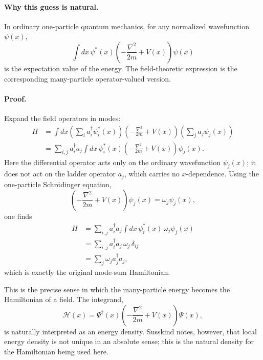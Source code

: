\paragraph{Why this guess is natural.}
In ordinary one-particle quantum mechanics, for any normalized wavefunction $\psi(x)$,
\begin{equation}
\int dx\,\psi^*(x)\left(-\frac{\nabla^2}{2m}+V(x)\right)\psi(x)
\end{equation}
is the expectation value of the energy. The field-theoretic expression is the corresponding many-particle operator-valued version.

\paragraph{Proof.}
Expand the field operators in modes:
\begin{align}
H
&=\int dx
\left(\sum_i a_i^\dagger \psi_i^*(x)\right)
\left(-\frac{\nabla^2}{2m}+V(x)\right)
\left(\sum_j a_j \psi_j(x)\right) \\
&=\sum_{i,j} a_i^\dagger a_j
\int dx\,\psi_i^*(x)
\left(-\frac{\nabla^2}{2m}+V(x)\right)\psi_j(x).
\end{align}
Here the differential operator acts only on the ordinary wavefunction $\psi_j(x)$; it does not act on the ladder operator $a_j$, which carries no $x$-dependence. Using the one-particle Schrödinger equation,
\begin{equation}
\left(-\frac{\nabla^2}{2m}+V(x)\right)\psi_j(x)=\omega_j\psi_j(x),
\end{equation}
one finds
\begin{align}
H
&=\sum_{i,j} a_i^\dagger a_j
\int dx\,\psi_i^*(x)\,\omega_j\psi_j(x) \\
&=\sum_{i,j} a_i^\dagger a_j\,\omega_j\,\delta_{ij} \\
&=\sum_j \omega_j a_j^\dagger a_j,
\end{align}
which is exactly the original mode-sum Hamiltonian.

This is the precise sense in which the many-particle energy becomes the Hamiltonian of a field. The integrand,
\begin{equation}
\mathcal{H}(x)=\Psi^\dagger(x)\left(-\frac{\nabla^2}{2m}+V(x)\right)\Psi(x),
\end{equation}
is naturally interpreted as an energy density. Susskind notes, however, that local energy density is not unique in an absolute sense; this is the natural density for the Hamiltonian being used here.

